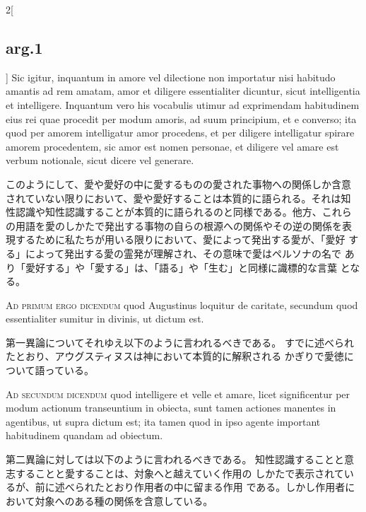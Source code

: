\documentclass[paper=a4paper,fontsize=10pt,jafontsize=9pt,titlepage]{jlreq}
\begin{document}
\begin{paracol}{2}[\subsection{arg.1}]
Sic igitur, inquantum in amore vel dilectione non importatur
nisi habitudo amantis ad rem amatam, amor et diligere essentialiter
dicuntur, sicut intelligentia et intelligere. Inquantum vero his
vocabulis utimur ad exprimendam habitudinem eius rei quae procedit per
modum amoris, ad suum principium, et e converso; ita quod per amorem
intelligatur amor procedens, et per diligere intelligatur spirare
amorem procedentem, sic amor est nomen personae, et diligere vel amare
est verbum notionale, sicut dicere vel generare.

\switchcolumn

このようにして、愛や愛好の中に愛するものの愛された事物への関係しか含意
されていない限りにおいて、愛や愛好することは本質的に語られる。それは知
性認識や知性認識することが本質的に語られるのと同様である。他方、これら
の用語を愛のしかたで発出する事物の自らの根源への関係やその逆の関係を表
現するために私たちが用いる限りにおいて、愛によって発出する愛が、「愛好
する」によって発出する愛の霊発が理解され、その意味で愛はペルソナの名で
あり「愛好する」や「愛する」は、「語る」や「生む」と同様に識標的な言葉
となる。

\switchcolumn*[\subsection{ad.1}]

{\scshape Ad primum ergo dicendum} quod Augustinus loquitur de caritate, secundum
quod essentialiter sumitur in divinis, ut dictum est.

\switchcolumn

第一異論についてそれゆえ以下のように言われるべきである。
すでに述べられたとおり、アウグスティヌスは神において本質的に解釈される
かぎりで愛徳について語っている。

\switchcolumn*[\subsection{ad.2}]

{\scshape Ad secundum dicendum} quod intelligere et velle et amare, licet
significentur per modum actionum transeuntium in obiecta, sunt tamen
actiones manentes in agentibus, ut supra dictum est; ita tamen quod in
ipso agente important habitudinem quandam ad obiectum.

\switchcolumn

第二異論に対しては以下のように言われるべきである。
知性認識することと意志することと愛することは、対象へと越えていく作用の
 しかたで表示されているが、前に述べられたとおり作用者の中に留まる作用
 である。しかし作用者において対象へのある種の関係を含意している。


\end{paracol}
\end{document}

